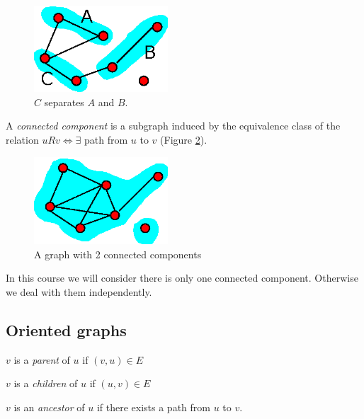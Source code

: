 \documentclass[12pt]{report}
\begin{document}
\FloatBarrier
\begin{figure}[ht]
  \centering
  \includegraphics[width=5cm]{./figures/graph06.eps}
  \caption{$C$ separates $A$ and $B$.}
  \label{graph06}
\end{figure}

\begin{definition}
  A \emph{connected component} is a subgraph induced by the equivalence class of the relation $uRv\Leftrightarrow\exists$ path from $u$ to $v$ (Figure \ref{graph07}).
\end{definition}

\begin{figure}[ht]
  \centering
  \includegraphics[width=5cm]{./figures/graph07.eps}
  \caption{A graph with 2 connected components}
 \label{graph07}
 \end{figure}

\FloatBarrier
In this course we will consider there is only one connected component. Otherwise we deal with them independently.


\subsection{Oriented graphs}

\begin{definition}[parent]
 $v$ is a \emph{parent} of $u$ if $(v,u)\in E$
\end{definition}

\begin{definition}[children]
  $v$ is a \emph{children} of $u$ if $(u,v)\in E$
\end{definition}

\begin{definition}[ancestor]
  $v$ is an \emph{ancestor} of $u$ if there exists a path from $u$ to $v$.
\end{definition}
\end{document}
